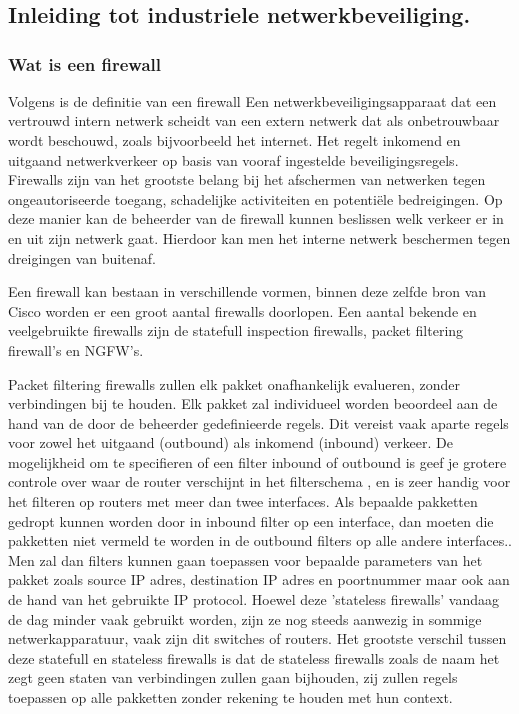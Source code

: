 \chapter{}%
\label{ch:stand-van-zaken}

\section{Inleiding tot industriele netwerkbeveiliging.}

\subsection{Wat is een firewall}
Volgens \textcite{ciscoFW2025} is de definitie van een firewall Een netwerkbeveiligingsapparaat dat een vertrouwd intern netwerk scheidt van een extern netwerk dat als onbetrouwbaar wordt beschouwd, zoals bijvoorbeeld het internet. Het regelt inkomend en uitgaand netwerkverkeer op basis van vooraf ingestelde beveiligingsregels. Firewalls zijn van het grootste belang bij het afschermen van netwerken tegen ongeautoriseerde toegang, schadelijke activiteiten en potentiële bedreigingen.
Op deze manier kan de beheerder van de firewall kunnen beslissen welk verkeer er in en uit zijn netwerk gaat. Hierdoor kan men het interne netwerk beschermen tegen dreigingen van buitenaf.



Een firewall kan bestaan in verschillende vormen, binnen deze zelfde bron van Cisco worden er een groot aantal firewalls doorlopen. Een aantal bekende en veelgebruikte firewalls zijn de statefull inspection firewalls, packet filtering firewall's  en NGFW's.
 
Packet filtering firewalls zullen elk pakket onafhankelijk evalueren, zonder verbindingen bij te houden. Elk pakket zal individueel worden beoordeel aan de hand van de door de beheerder gedefinieerde regels. Dit vereist vaak aparte regels voor zowel het uitgaand (outbound) als inkomend (inbound) verkeer. De mogelijkheid om te specifieren of een filter inbound of outbound is geef je grotere controle over waar de router verschijnt in het filterschema , en is zeer handig voor het filteren op routers met meer dan twee interfaces. Als bepaalde pakketten gedropt kunnen worden door in inbound filter op een interface, dan moeten die pakketten niet vermeld te worden in de outbound filters op alle andere interfaces.. Men zal dan filters kunnen gaan toepassen voor bepaalde parameters van het pakket zoals source IP adres, destination IP adres en poortnummer maar ook aan de hand van het gebruikte IP protocol. Hoewel deze 'stateless firewalls' vandaag de dag minder vaak gebruikt worden, zijn ze nog steeds aanwezig in sommige netwerkapparatuur, vaak zijn dit switches of routers. Het grootste verschil tussen deze statefull en stateless firewalls is dat de stateless firewalls zoals de naam het zegt geen staten van verbindingen zullen gaan bijhouden, zij zullen regels toepassen op alle pakketten zonder rekening te houden met hun context. \autocite{goel2014}

